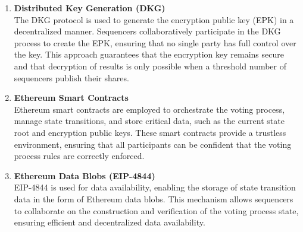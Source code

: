 \begin{enumerate}
	\item \textbf{Distributed Key Generation (DKG)} \\
	
	The DKG protocol is used to generate the encryption public key (EPK) in a decentralized manner. Sequencers collaboratively participate in the DKG process to create the EPK, ensuring that no single party has full control over the key. This approach guarantees that the encryption key remains secure and that decryption of results is only possible when a threshold number of sequencers publish their shares. \\
	
	\item \textbf{Ethereum Smart Contracts} \\
	
	Ethereum smart contracts are employed to orchestrate the voting process, manage state transitions, and store critical data, such as the current state root and encryption public keys. These smart contracts provide a trustless environment, ensuring that all participants can be confident that the voting process rules are correctly enforced. \\
	
	\item \textbf{Ethereum Data Blobs (EIP-4844)} \\
	
	EIP-4844 is used for data availability, enabling the storage of state transition data in the form of Ethereum data blobs. This mechanism allows sequencers to collaborate on the construction and verification of the voting process state, ensuring efficient and decentralized data availability.
\end{enumerate}